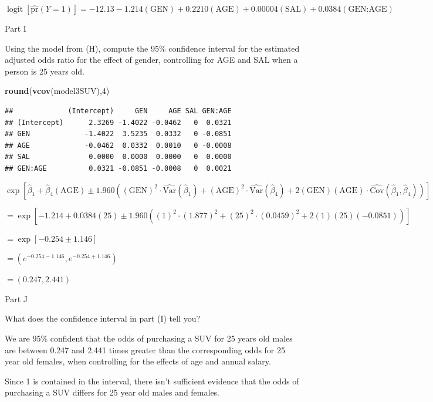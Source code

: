\documentclass[
]{article}
\newenvironment{Shaded}{\begin{snugshade}}{\end{snugshade}}
\newcommand{\DecValTok}[1]{\textcolor[rgb]{0.00,0.00,0.81}{#1}}
\newcommand{\FunctionTok}[1]{\textcolor[rgb]{0.13,0.29,0.53}{\textbf{#1}}}
\newcommand{\NormalTok}[1]{#1}
\begin{document}
\(\operatorname{logit}\left[ \widehat{\text{pr}}\left( Y=1 \right) \right]=-12.13-1.214\left( \text{GEN} \right)+0.2210\left( \text{AGE} \right)+0.00004\left( \text{SAL} \right)+0.0384\left( \text{GEN:AGE} \right)\)

Part I

Using the model from (H), compute the 95\% confidence interval for the
estimated adjusted odds ratio for the effect of gender, controlling for
AGE and SAL when a person is 25 years old.

\begin{Shaded}
\begin{Highlighting}[]
\FunctionTok{round}\NormalTok{(}\FunctionTok{vcov}\NormalTok{(model3SUV),}\DecValTok{4}\NormalTok{)}
\end{Highlighting}
\end{Shaded}

\begin{verbatim}
##             (Intercept)     GEN     AGE SAL GEN:AGE
## (Intercept)      2.3269 -1.4022 -0.0462   0  0.0321
## GEN             -1.4022  3.5235  0.0332   0 -0.0851
## AGE             -0.0462  0.0332  0.0010   0 -0.0008
## SAL              0.0000  0.0000  0.0000   0  0.0000
## GEN:AGE          0.0321 -0.0851 -0.0008   0  0.0021
\end{verbatim}

\(\exp \left[ {{{\hat{\beta }}}_{1}}+{{{\hat{\beta }}}_{4}}\left( \text{AGE} \right)\pm 1.960\left( {{\left( \text{GEN} \right)}^{2}}\cdot \widehat{\text{Var}}\left( {{{\hat{\beta }}}_{1}} \right)+{{\left( \text{AGE} \right)}^{2}}\cdot \widehat{\text{Var}}\left( {{{\hat{\beta }}}_{4}} \right)+2\left( \text{GEN} \right)\left( \text{AGE} \right)\cdot \widehat{\text{Cov}}\left( {{{\hat{\beta }}}_{1}},{{{\hat{\beta }}}_{4}} \right) \right) \right]\)

\(=\exp \left[ -1.214+0.0384\left( 25 \right)\pm 1.960\left( {{\left( 1 \right)}^{2}}\cdot {{\left( 1.877 \right)}^{2}}+{{\left( 25 \right)}^{2}}\cdot {{\left( 0.0459 \right)}^{2}}+2\left( 1 \right)\left( 25 \right)\left( -0.0851 \right) \right) \right]\)

\(=\exp \left[ -0.254\pm 1.146 \right]\)

\(=\left( {{e}^{-0.254-1.146}},{{e}^{-0.254+1.146}} \right)\)

\(=\left( 0.247,2.441 \right)\)

Part J

What does the confidence interval in part (I) tell you?

We are 95\% confident that the odds of purchasing a SUV for 25 years old
males are between 0.247 and 2.441 times greater than the corresponding
odds for 25 year old females, when controlling for the effects of age
and annual salary.

Since 1 is contained in the interval, there isn't sufficient evidence
that the odds of purchasing a SUV differs for 25 year old males and
females.
\end{document}
